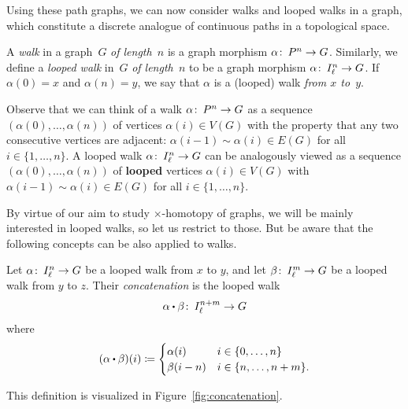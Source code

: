 \documentclass[11pt,a4paper]{article}
\begin{document}
	Using these path graphs, we can now consider walks and looped walks in a graph, which constitute a discrete analogue of continuous paths in a topological space.

	\begin{defi}
		A \textit{walk} in a graph~$G$ \textit{of length~$n$} is a graph morphism $\alpha\colon\thinspace P^n\to G$.
		Similarly, we define a \textit{looped walk} in~$G$ \textit{of length~$n$} to be a graph morphism $\alpha\colon\thinspace I^n_\ell\to G$.
		If $\alpha(0)=x$ and $\alpha(n)=y$, we say that $\alpha$ is a (looped) walk \textit{from $x$ to~$y$}.
	\end{defi}	
	
	Observe that we can think of a walk $\alpha\colon\thinspace P^n\to G$ as a sequence $(\alpha(0),\dots,\alpha(n))$ of vertices $\alpha(i)\in V(G)$ with the property that any two consecutive vertices are adjacent: $\alpha(i-1)\sim\alpha(i)\in E(G)$ for all $i\in \{1,\dots,n \}$.
	A looped walk $\alpha\colon\thinspace I^n_\ell\to G$ can be analogously viewed as a sequence $(\alpha(0),\dots,\alpha(n))$ of \textbf{looped} vertices $\alpha(i)\in V(G)$ with $\alpha(i-1)\sim\alpha(i)\in E(G)$ for all $i\in \{1,\dots,n \}$.

	By virtue of our aim to study $\times$-homotopy of graphs, we will be mainly interested in looped walks, so let us restrict to those. But be aware that the following concepts can be also applied to walks.
	
	\begin{defi}
		Let $\alpha\colon\thinspace I^n_\ell\to G$ be a looped walk from $x$ to $y$, and let $\beta\colon\thinspace I^m_\ell\to G$ be a looped walk from $y$ to $z$. Their \textit{concatenation} is the looped walk
		\[ \alpha\bigcdot\beta\co I^{n+m}_\ell\to G \]
		where
		\[ (\alpha\bigcdot\beta)(i)\coloneqq \begin{cases}
			\alpha(i) & i\in\{0,\dots,n\} \\
			\beta(i-n) & i\in\{n,\dots,n+m\}.
		\end{cases} \]
	\end{defi}

	\medskip
	\noindent This definition is visualized in Figure~\ref{fig:concatenation}.
\end{document}
